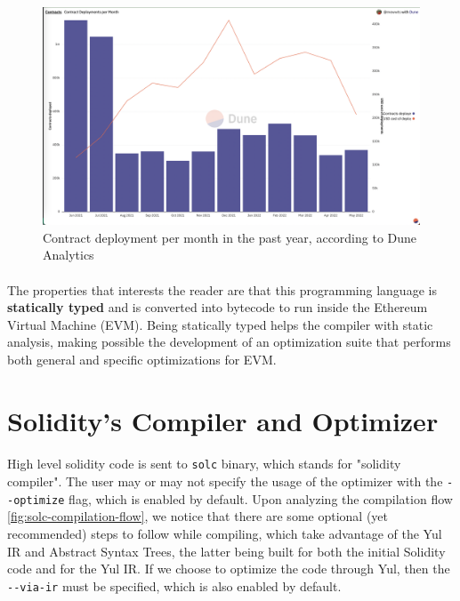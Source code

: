 \begin{figure}
    \centering
    \includegraphics[width=15cm]{images/dune_analytics_2022.png}
    \caption{Contract deployment per month in the past year, according to Dune Analytics}
    \label{fig:dune-analytics-2022}
\end{figure}

\paragraph*{}
The properties that interests the reader are that this programming language is \textbf{statically typed} and is converted into bytecode to run inside the Ethereum Virtual Machine (EVM). Being statically typed helps the compiler with static analysis, making possible the development of an optimization suite that performs both general and specific optimizations for EVM.


\section{Solidity's Compiler and Optimizer}
\paragraph*{}
High level solidity code is sent to \lstinline[columns=fixed]{solc} binary, which stands for "solidity compiler". The user may or may not specify the usage of the optimizer with the \lstinline[columns=fixed]{--optimize} flag, which is enabled by default. Upon analyzing the compilation flow \ref*{fig:solc-compilation-flow}, we notice that there are some optional (yet recommended) steps to follow while compiling, which take advantage of the Yul IR and Abstract Syntax Trees, the latter being built for both the initial Solidity code and for the Yul IR. If we choose to optimize the code through Yul, then the \lstinline[columns=fixed]{--via-ir} must be specified, which is also enabled by default.

